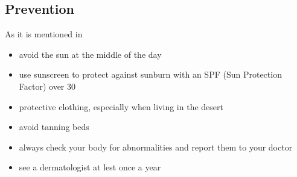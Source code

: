     \subsection{Prevention}
        As it is mentioned in ~\cite{mayo2020, scfp2022} 
        \begin{itemize}
        \item avoid the sun at the middle of the day
        \item use sunscreen to protect against sunburn with an SPF (Sun Protection Factor) over 30
        \item protective clothing, especially when living in the desert
        \item avoid tanning beds
        \item always check your body for abnormalities and report them to your doctor
        \item see a dermatologist at lest once a year
        \end{itemize}


